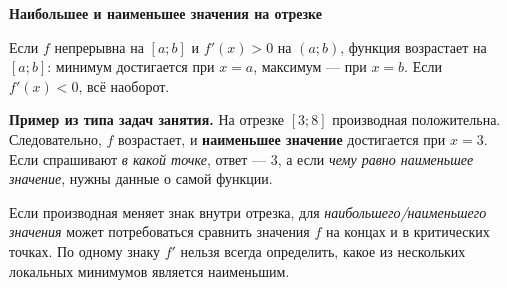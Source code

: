 \documentclass[a4paper,12pt]{article}
\newcommand{\subline}[1]{{\large\bfseries\color{darkaccent}#1}\par}
\begin{document}
\subline{Наибольшее и наименьшее значения на отрезке}
Если $f$ непрерывна на $[a;b]$ и $f'(x)>0$ на $(a;b)$, функция возрастает на $[a;b]$: минимум достигается при $x=a$, максимум --- при $x=b$. Если $f'(x)<0$, всё наоборот.

\textbf{Пример из типа задач занятия.} На отрезке $[3;8]$ производная положительна. Следовательно, $f$ возрастает, и \textbf{наименьшее значение} достигается при $x=3$. Если спрашивают \emph{в какой точке}, ответ --- $3$, а если \emph{чему равно наименьшее значение}, нужны данные о самой функции.

Если производная меняет знак внутри отрезка, для \emph{наибольшего/наименьшего значения} может потребоваться сравнить значения $f$ на концах и в критических точках. По одному знаку $f'$ нельзя всегда определить, какое из нескольких локальных минимумов является наименьшим.
\end{document}
